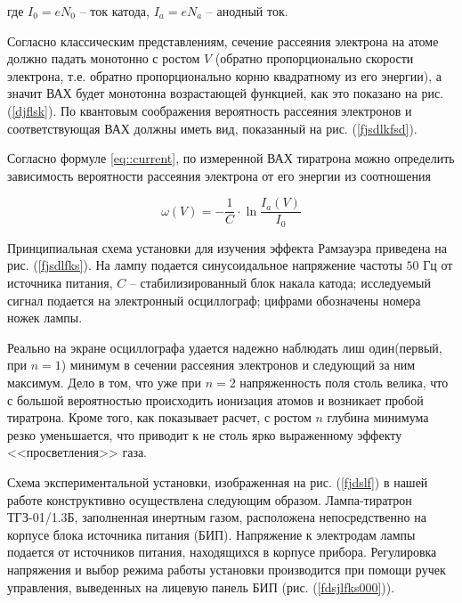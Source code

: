 где $I_0 = e N_0$ -- ток катода, $I_a = e N_a$ -- анодный ток.

Согласно классическим представлениям, сечение рассеяния электрона на атоме
должно падать монотонно с ростом $V$ (обратно пропорционально скорости
электрона, т.е. обратно пропорционально корню квадратному из его энергии), а
значит ВАХ будет монотонна возрастающей функцией, как это показано на рис.
(\ref{djflsk}). По квантовым соображения вероятность рассеяния электронов и
соответствующая ВАХ должны иметь вид, показанный на рис. (\ref{fjsdlkfsd}).

Согласно формуле \eqref{eq::current}, по измеренной ВАХ тиратрона можно
определить зависимость вероятности рассеяния электрона от его энергии из
соотношения

\begin{equation}
  \omega(V) = -\frac{1}{C} \cdot \ln \frac{I_a(V)}{I_0}
\end{equation}

Принципиальная схема установки для изучения эффекта Рамзауэра приведена на рис.
(\ref{fjsdlfks}). На лампу подается синусоидальное напряжение частоты $50$ Гц от
источника питания, $C$ -- стабилизированный блок накала катода; исследуемый
сигнал подается на электронный осциллограф; цифрами обозначены номера ножек
лампы.

Реально на экране осциллографа удается надежно наблюдать лиш один(первый, при $n
= 1$) минимум в сечении рассеяния электронов и следующий за ним максимум. Дело в
том, что уже при $n = 2$ напряженность поля столь велика, что с большой
вероятностью происходить ионизация атомов и возникает пробой тиратрона. Кроме
того, как показывает расчет, с ростом $n$ глубина минимума резко уменьшается,
что приводит к не столь ярко выраженному эффекту <<просветления>> газа.

Схема экспериментальной установки, изображенная на рис. (\ref{fjdslf}) в нашей
работе конструктивно осуществлена следующим образом. Лампа-тиратрон ТГЗ-01/1.3Б,
заполненная инертным газом, расположена непосредственно на корпусе блока
источника питания (БИП). Напряжение к электродам лампы подается от источников
питания, находящихся в корпусе прибора. Регулировка напряжения и выбор режима
работы установки производится при помощи ручек управления, выведенных на лицевую
панель БИП (рис. (\ref{fdsjlfks000})).
